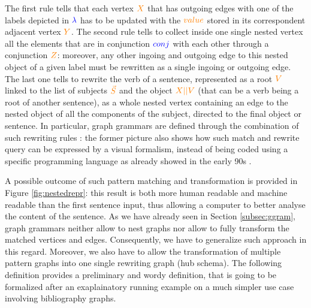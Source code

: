 	The first rule tells that each vertex $\color{orange}X$ that has outgoing edges with one of the labels depicted in $\color{blue}\lambda$ has to be updated with the $\color{orange} value$ stored in its correspondent adjacent vertex $\color{orange} Y$. The second rule tells to collect inside one single nested vertex all the elements that are in conjunction $\color{blue}conj$ with each other through a conjunction $\color{orange} Z$: moreover, any other ingoing and outgoing edge to this nested object of a given label  must be rewritten as a single ingoing or outgoing edge. The last one tells to rewrite the verb of a sentence, represented as a root $\color{orange} V$ linked to the list of subjects $\color{orange} \vec{S}$ and the object $\color{orange}X||V$ (that can be a verb being a root of another sentence), as a whole nested vertex containing an edge to the nested object of all the components of the subject, directed to the final object or sentence. 
	In particular,  graph grammars are defined through the combination of such rewriting rules   \cite{GraphLogAggr,Plump1998Term}: the former  picture also shows how such match and rewrite query can be expressed by a visual formalism, instead of being coded using a specific programming language as already showed in the early 90s \cite{GraphLogAggr}.
	
	
	A possible outcome of such pattern matching and transformation is provided in Figure \ref{fig:nestedrepr}: this  result is both more human readable and machine readable than the first sentence input, thus allowing a computer to better analyse the content of the sentence. As we have already seen in Section \vref{subsec:ggram}, graph grammars neither allow to nest graphs nor allow to fully transform the matched vertices and edges. Consequently, we have to generalize  such approach in this regard. Moreover, we also have to allow the transformation of multiple pattern graphs into one single rewriting graph (hub schema). The following definition provides  a preliminary and wordy definition, that is going to be formalized after an exaplainatory running example on a much simpler use case involving bibliography graphs. 
	
	
	






